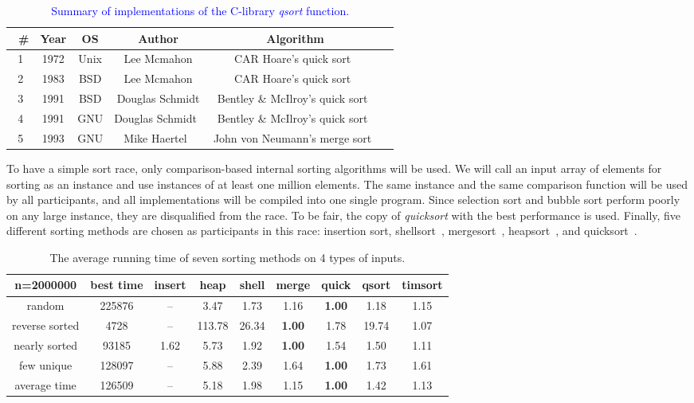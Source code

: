 \documentclass[AMA,STIX1COL]{WileyNJD-v2}
\newcommand{\qusort}{\emph{quicksort }}
\newcommand{\qsort}{\emph{qsort }}
\begin{document}
\begin{table}
\caption{\textcolor{blue}{Summary of implementations of the C-library \qsort function.}}
\centering
\begin{tabular}{|c|c|c|c|c|c|}
\toprule\
\# & Year & OS & Author & Algorithm\\
\midrule
1 & 1972 & Unix & Lee Mcmahon & CAR Hoare's quick sort~\cite{hoare1961algorithm}\\
2 & 1983 & BSD & Lee Mcmahon & CAR Hoare's quick sort~\cite{hoare1961algorithm}\\
3 & 1991 & BSD & Douglas Schmidt & Bentley \& McIlroy’s quick sort~\cite{bentley1993engineering}\\
4 & 1991 & GNU & Douglas Schmidt~\cite{gnuqsort} & Bentley \& McIlroy’s quick sort~\cite{bentley1993engineering}\\
5 & 1993 & GNU & Mike Haertel~\cite{gnumergesort} & John von Neumann's merge sort~\cite{knuth1998sorting}\\
\bottomrule
\end{tabular}
\label{qsortalgo}
\end{table}
To have a simple sort race, only comparison-based internal sorting algorithms will be used. 
We will call an input array of elements for sorting as an instance and use instances of at least one million elements. 
The same instance and the same comparison function will be used by all participants, and all implementations will be compiled into one single program. 
Since selection sort and bubble sort perform poorly on any large instance, they are disqualified from the race. 
To be fair, the copy of \qusort with the best performance is used.
Finally, five different sorting methods are chosen as participants in this race: insertion sort, shellsort~\cite{knuth97}, mergesort~\cite{mcilroy1993optimistic}, heapsort~\cite{williams1964algorithm}, and quicksort~\cite{hoare1961algorithm}.

\begin{table}
\caption{The average running time of seven sorting methods on 4 types of inputs.}
\centering
\begin{tabular}{|c|c|c|c|c|c|c|c|c|}
\toprule
n=2000000 & best time & insert & heap & shell & merge & quick & qsort & timsort\\
\midrule
random & 225876 & -- & 3.47 & 1.73 & 1.16 & \textbf{1.00} & 1.18 & 1.15 \\
reverse sorted&4728&--&113.78&26.34&\textbf{1.00}&1.78&19.74&1.07\\
nearly sorted & 93185&1.62&5.73&1.92&\textbf{1.00} & 1.54 &1.50 &1.11 \\
few unique & 128097 & --	& 5.88 & 2.39 & 1.64 & \textbf{1.00} & 1.73 & 1.61 \\
average time & 126509 & -- &	5.18& 1.98 & 1.15 & \textbf{1.00} & 1.42 & 1.13 \\
\bottomrule
\end{tabular}
\label{table1}
\end{table}
\end{document}
